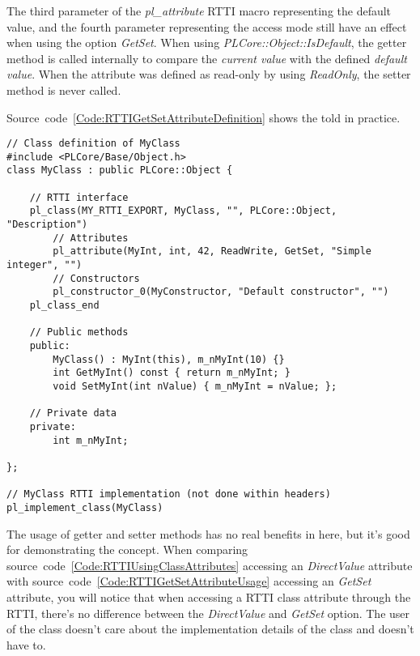 The third parameter of the \emph{pl\_attribute} RTTI macro representing the default value, and the fourth parameter representing the access mode still have an effect when using the option \emph{GetSet}. When using \emph{PLCore::Object::IsDefault}, the getter method is called internally to compare the \emph{current value} with the defined \emph{default value}. When the attribute was defined as read-only by using \emph{ReadOnly}, the setter method is never called.

Source~code~\ref{Code:RTTIGetSetAttributeDefinition} shows the told in practice.
\begin{lstlisting}[label=Code:RTTIGetSetAttributeDefinition,caption={Defining an RTTI class attribute using getter and setter methods}]
// Class definition of MyClass
#include <PLCore/Base/Object.h>
class MyClass : public PLCore::Object {

	// RTTI interface
	pl_class(MY_RTTI_EXPORT, MyClass, "", PLCore::Object, "Description")
		// Attributes
		pl_attribute(MyInt, int, 42, ReadWrite, GetSet, "Simple integer", "")
		// Constructors
		pl_constructor_0(MyConstructor, "Default constructor", "")
	pl_class_end

	// Public methods
	public:
		MyClass() : MyInt(this), m_nMyInt(10) {}
		int GetMyInt() const { return m_nMyInt; }
		void SetMyInt(int nValue) { m_nMyInt = nValue; };

	// Private data
	private:
		int m_nMyInt;

};

// MyClass RTTI implementation (not done within headers)
pl_implement_class(MyClass)
\end{lstlisting}
The usage of getter and setter methods has no real benefits in here, but it's good for demonstrating the concept. When comparing source~code~\ref{Code:RTTIUsingClassAttributes} accessing an \emph{DirectValue} attribute with source~code~\ref{Code:RTTIGetSetAttributeUsage} accessing an \emph{GetSet} attribute, you will notice that when accessing a RTTI class attribute through the RTTI, there's no difference between the \emph{DirectValue} and \emph{GetSet} option. The user of the class doesn't care about the implementation details of the class and doesn't have to.
